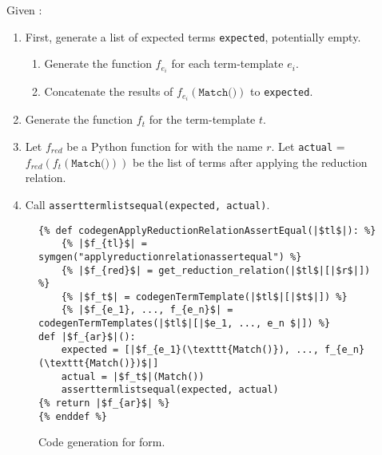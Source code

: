 Given \ApplyReductionRelationAssertEqual:
\begin{enumerate}
\item First, generate a list of expected terms \texttt{expected}, potentially empty.
	\begin{enumerate}
	\item Generate the function $f_{e_i}$ for each term-template $e_i$.
	\item Concatenate the results of $f_{e_i}(\texttt{Match()})$ to \texttt{expected}.
	\end{enumerate}
\item Generate the function $f_t$ for the term-template $t$.
\item Let $f_{red}$ be a Python function for \DefineReductionRelationNoArgs \space with the name $r$. Let \texttt{actual} = $f_{red}(f_t(\texttt{Match()}))$ be the list of terms after applying the reduction relation.
\item Call \texttt{asserttermlistsequal(expected, actual)}.
\end{enumerate}

\begin{figure}[htb]
\begin{verbatim}
{% def codegenApplyReductionRelationAssertEqual(|$tl$|): %}
	{% |$f_{tl}$| = symgen("applyreductionrelationassertequal") %}
	{% |$f_{red}$| = get_reduction_relation(|$tl$|[|$r$|]) %}
	{% |$f_t$| = codegenTermTemplate(|$tl$|[|$t$|]) %}
	{% |$f_{e_1}, ..., f_{e_n}$| = codegenTermTemplates(|$tl$|[|$e_1, ..., e_n $|]) %}
def |$f_{ar}$|():
	expected = [|$f_{e_1}(\texttt{Match()}), ..., f_{e_n}(\texttt{Match()})$|]
	actual = |$f_t$|(Match())
	asserttermlistsequal(expected, actual)
{% return |$f_{ar}$| %}
{% enddef %}
\end{verbatim}
\caption{Code generation for \ApplyReductionRelationAssertEqualNoArgs \space form.}
\label{codegen-applyred}
\end{figure}

